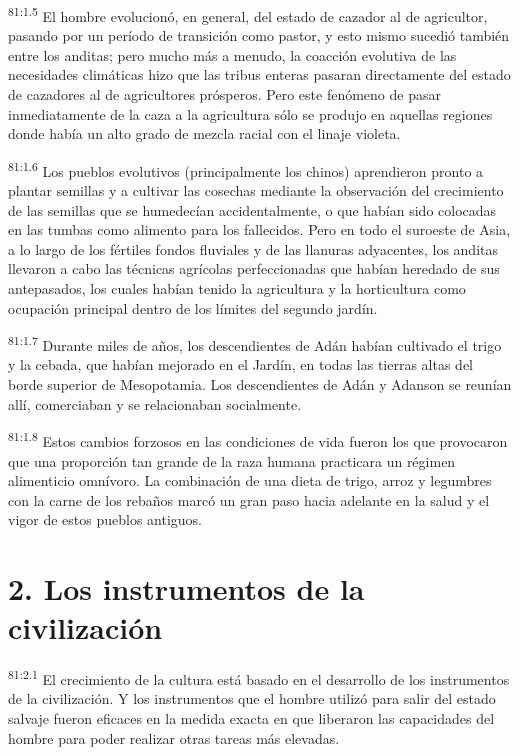 \documentclass[twoside, 11pt]{book}
\begin{document}
\par
\textsuperscript{81:1.5} El hombre evolucionó, en general, del estado de cazador al de agricultor, pasando por un período de transición como pastor, y esto mismo sucedió también entre los anditas; pero mucho más a menudo, la coacción evolutiva de las necesidades climáticas hizo que las tribus enteras pasaran directamente del estado de cazadores al de agricultores prósperos. Pero este fenómeno de pasar inmediatamente de la caza a la agricultura sólo se produjo en aquellas regiones donde había un alto grado de mezcla racial con el linaje violeta.

\par
\textsuperscript{81:1.6} Los pueblos evolutivos (principalmente los chinos) aprendieron pronto a plantar semillas y a cultivar las cosechas mediante la observación del crecimiento de las semillas que se humedecían accidentalmente, o que habían sido colocadas en las tumbas como alimento para los fallecidos. Pero en todo el suroeste de Asia, a lo largo de los fértiles fondos fluviales y de las llanuras adyacentes, los anditas llevaron a cabo las técnicas agrícolas perfeccionadas que habían heredado de sus antepasados, los cuales habían tenido la agricultura y la horticultura como ocupación principal dentro de los límites del segundo jardín.

\par
\textsuperscript{81:1.7} Durante miles de años, los descendientes de Adán habían cultivado el trigo y la cebada, que habían mejorado en el Jardín, en todas las tierras altas del borde superior de Mesopotamia. Los descendientes de Adán y Adanson se reunían allí, comerciaban y se relacionaban socialmente.

\par
\textsuperscript{81:1.8} Estos cambios forzosos en las condiciones de vida fueron los que provocaron que una proporción tan grande de la raza humana practicara un régimen alimenticio omnívoro. La combinación de una dieta de trigo, arroz y legumbres con la carne de los rebaños marcó un gran paso hacia adelante en la salud y el vigor de estos pueblos antiguos.

\section*{2. Los instrumentos de la civilización}
\par
\textsuperscript{81:2.1} El crecimiento de la cultura está basado en el desarrollo de los instrumentos de la civilización. Y los instrumentos que el hombre utilizó para salir del estado salvaje fueron eficaces en la medida exacta en que liberaron las capacidades del hombre para poder realizar otras tareas más elevadas.
\end{document}
